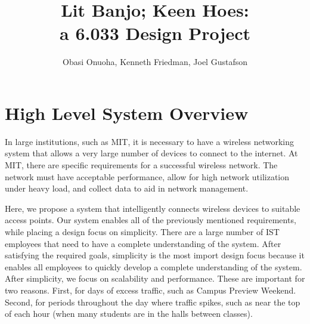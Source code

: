 \documentclass[10pt,journal,compsoc]{IEEEtran}
\begin{document}
	
	\title{Lit Banjo; Keen Hoes:\\a 6.033 Design Project}
	
	
	\author{Obasi Onuoha, Kenneth Friedman, Joel Gustafson}%
	
	
			
		\maketitle
		
		\section{High Level System Overview}
		In large institutions, such as MIT, it is necessary to have a wireless networking system that allows a very large number of devices to connect to the internet. At MIT, there are specific requirements for a successful wireless network. The network must have acceptable performance, allow for high network utilization under heavy load, and collect data to aid in network management.
		
		Here, we propose a system that intelligently connects wireless devices to suitable access points. Our system enables all of the previously mentioned requirements, while placing a design focus on simplicity. There are a large number of IST employees that need to have a complete understanding of the system. After satisfying the required goals, simplicity is the most import design focus because it enables all employees to quickly develop a complete understanding of the system. After simplicity, we focus on scalability and performance. These are important for two reasons. First, for days of excess traffic, such as Campus Preview Weekend. Second, for periods throughout the day where traffic spikes, such as near the top of each hour (when many students are in the halls between classes).
		
\end{document}
